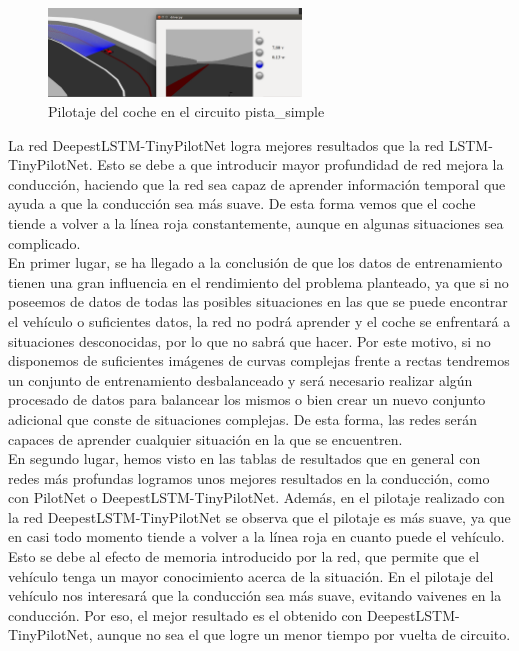 \begin{figure}[H]
\begin{center}
	\includegraphics[width=0.6\textwidth]{figures/Regresion/deep_small.png}
   \caption{Pilotaje del coche en el circuito pista\_simple}
	\label{fig.small_reg}
\end{center}
\end{figure}



La red DeepestLSTM-TinyPilotNet logra mejores resultados que la red LSTM-TinyPilotNet. Esto se debe a que introducir mayor profundidad de red mejora la conducción, haciendo que la red sea capaz de aprender información temporal que ayuda a que la conducción sea más suave. De esta forma vemos que el coche tiende a volver a la línea roja constantemente, aunque en algunas situaciones sea complicado. \\



En primer lugar, se ha llegado a la conclusión de que los datos de entrenamiento tienen una gran influencia en el rendimiento del problema planteado, ya que si no poseemos de datos de todas las posibles situaciones en las que se puede encontrar el vehículo o suficientes datos, la red no podrá aprender y el coche se enfrentará a situaciones desconocidas, por lo que no sabrá que hacer. Por este motivo, si no disponemos de suficientes imágenes de curvas complejas frente a rectas tendremos un conjunto de entrenamiento desbalanceado y será necesario realizar algún procesado de datos para balancear los mismos o bien crear un nuevo conjunto adicional que conste de situaciones complejas. De esta forma, las redes serán capaces de aprender cualquier situación en la que se encuentren.\\


En segundo lugar, hemos visto en las tablas de resultados que en general con redes más profundas logramos unos mejores resultados en la conducción, como con PilotNet o DeepestLSTM-TinyPilotNet. Además, en el pilotaje realizado con la red DeepestLSTM-TinyPilotNet se observa que el pilotaje es más suave, ya que en casi todo momento tiende a volver a la línea roja en cuanto puede el vehículo. Esto se debe al efecto de memoria introducido por la red, que permite que el vehículo tenga un mayor conocimiento acerca de la situación. En el pilotaje del vehículo nos interesará que la conducción sea más suave, evitando vaivenes en la conducción. Por eso, el mejor resultado es el obtenido con DeepestLSTM-TinyPilotNet, aunque no sea el que logre un menor tiempo por vuelta de circuito.\\




